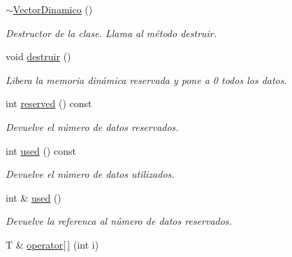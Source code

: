 \begin{DoxyCompactItemize}
\mbox{\label{classVectorDinamico_a09b51d45b99d4f08dd20419fd60f9a02}} 
\hyperlink{classVectorDinamico_a09b51d45b99d4f08dd20419fd60f9a02}{$\sim$\+Vector\+Dinamico} ()
\begin{DoxyCompactList}\small\item\em Destructor de la clase. Llama al método destruir. \end{DoxyCompactList}\item 
\mbox{\label{classVectorDinamico_a92b51c8ce82247eb58b2ac524c0ed21a}} 
void \hyperlink{classVectorDinamico_a92b51c8ce82247eb58b2ac524c0ed21a}{destruir} ()
\begin{DoxyCompactList}\small\item\em Libera la memoria dinámica reservada y pone a 0 todos los datos. \end{DoxyCompactList}\item 
\mbox{\label{classVectorDinamico_ab479ef938fc97debf2e553abece88dea}} 
int \hyperlink{classVectorDinamico_ab479ef938fc97debf2e553abece88dea}{reserved} () const
\begin{DoxyCompactList}\small\item\em Devuelve el número de datos reservados. \end{DoxyCompactList}\item 
\mbox{\label{classVectorDinamico_a4e443bf2fc01853938dee20bdb06fbd2}} 
int \hyperlink{classVectorDinamico_a4e443bf2fc01853938dee20bdb06fbd2}{used} () const
\begin{DoxyCompactList}\small\item\em Devuelve el número de datos utilizados. \end{DoxyCompactList}\item 
\mbox{\label{classVectorDinamico_ab0ae3fd146b1c023ef3b83b70611a603}} 
int \& \hyperlink{classVectorDinamico_ab0ae3fd146b1c023ef3b83b70611a603}{used} ()
\begin{DoxyCompactList}\small\item\em Devuelve la referenca al número de datos reservados. \end{DoxyCompactList}\item 
T \& \hyperlink{classVectorDinamico_ae7640a01e5e7c741ef915ee116272db2}{operator\mbox{[}$\,$\mbox{]}} (int i)

\end{DoxyCompactItemize}
